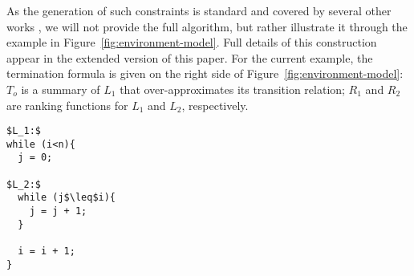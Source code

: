 \documentclass[a4paper]{llncs}
\begin{document}

As the generation of such constraints is standard and covered by several other works \cite{DBLP:conf/pldi/GrebenshchikovLPR12,DBLP:conf/pldi/GulwaniSV08}, 
we will not provide the full algorithm, but rather illustrate it through the example in Figure~\ref{fig:environment-model}.
Full details of this construction appear in the extended version of this paper.
For the current example, the termination formula is given on the right side of 
Figure~\ref{fig:environment-model}:
$T_o$ is a summary of $L_1$ that over-approximates its transition relation;
$R_1$ and $R_2$ are ranking functions for $L_1$ and $L_2$, respectively.

\begin{figure*}
\begin{framed}
\begin{minipage}{.2\textwidth}
\begin{lstlisting}[mathescape=true,basicstyle=\tiny]
$L_1:$
while (i<n){
  j = 0;

$L_2:$
  while (j$\leq$i){
    j = j + 1;
  }

  i = i + 1;
}
\end{lstlisting}
\end{minipage}
\vline
{}
\end{framed}
\caption{A program with nested loops and its termination formula\label{fig:environment-model}}
\end{figure*}
\end{document}
